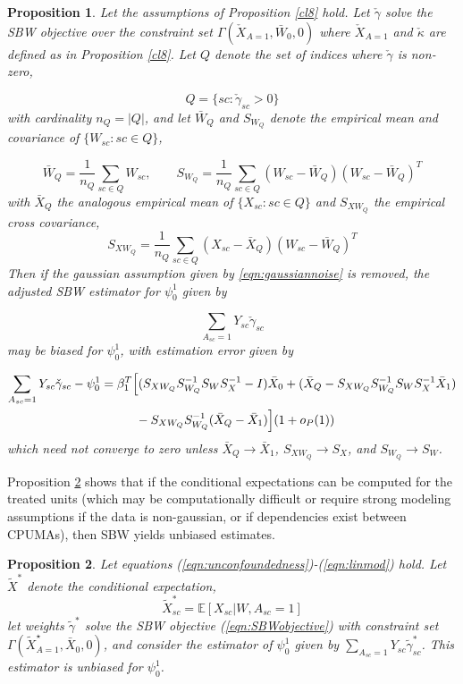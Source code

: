 \documentclass[aoas]{imsart}
\theoremstyle{plain}
\newtheorem{proposition}{Proposition}
\theoremstyle{remark}
\begin{document}
\begin{appendix}
\begin{proposition}\label{cl9}
Let the assumptions of Proposition \ref{cl8} hold. Let $\check{\gamma}$ solve the SBW objective over the constraint set $\Gamma(\check{X}_{A=1}, \bar{W}_0, 0)$ where $\check{X}_{A=1}$ and $\check{\kappa}$ are defined as in Proposition \ref{cl8}. Let $Q$ denote the set of indices where $\check{\gamma}$ is non-zero,

\[ Q = \{sc: \check{\gamma}_{sc} > 0\}\]
with cardinality $n_Q = |Q|$, and let $\bar{W}_Q$ and $S_{W_Q}$ denote the empirical mean and covariance of $\{W_{sc}:sc \in Q\}$,

\[ \bar{W}_Q = \frac{1}{n_Q}\sum_{sc \in Q} W_{sc},\qquad S_{W_Q} = \frac{1}{n_Q} \sum_{sc \in Q} (W_{sc} - \bar{W}_Q)(W_{sc} - \bar{W}_Q)^T\]
with $\bar{X}_Q$ the analogous empirical mean of $\{X_{sc}:sc \in Q\}$ and $S_{XW_Q}$ the empirical cross covariance,
\[ S_{XW_Q} = \frac{1}{n_Q} \sum_{sc \in Q} (X_{sc} - \bar{X}_Q)(W_{sc} - \bar{W}_Q)^T\]
Then if the gaussian assumption given by \eqref{eqn:gaussiannoise} is removed, the adjusted SBW estimator for $\psi_0^1$ given by 

\[\sum_{A_{sc}=1} Y_{sc} \check{\gamma}_{sc}\]
may be biased for $\psi_0^1$, with estimation error given by 

\begin{align} 
\nonumber \sum_{A_{sc}=1} Y_{sc} \check{\gamma}_{sc} - \psi_0^1 & = \beta_1^T\Big[(S_{XW_Q}S_{W_Q}^{-1}S_WS_X^{-1} - I)\bar{X}_0  + (\bar{X}_Q - S_{XW_Q}S_{W_Q}^{-1} S_W S_X^{-1} \bar{X}_1) \\
& \hskip1cm {} - S_{XW_Q}S_{W_Q}^{-1}(\bar{X}_Q - \bar{X}_1)\Big](1 + o_P(1))  \label{eqn:cl9.error}
\end{align}
which need not converge to zero unless $\bar{X}_Q \to \bar{X}_1$, $S_{XW_Q} \to S_X$, and $S_{W_Q} \to S_W$.
\end{proposition}

Proposition \ref{cl7} shows that if the conditional expectations can be computed for the treated units (which may be computationally difficult or require strong modeling assumptions if the data is non-gaussian, or if dependencies exist between CPUMAs), then SBW yields unbiased estimates. 

\begin{proposition}\label{cl7}
    Let equations (\ref{eqn:unconfoundedness})-(\ref{eqn:linmod}) hold. Let $\tilde{X}^*$ denote the conditional expectation,
    \[\tilde{X}^*_{sc} = \mathbb{E}[X_{sc} | W, A_{sc}=1]\]
    let weights $\tilde{\gamma}^*$ solve the SBW objective (\ref{eqn:SBWobjective}) with constraint set $\Gamma(\tilde{X}^\star_{A=1}, \bar{X}_0, 0)$, and consider the estimator of $\psi_0^1$ given by $\sum_{A_{sc}=1} Y_{sc} \tilde{\gamma}^*_{sc}$. This estimator is unbiased for $\psi_0^1$.
\end{proposition}


\end{appendix}
\end{document}
